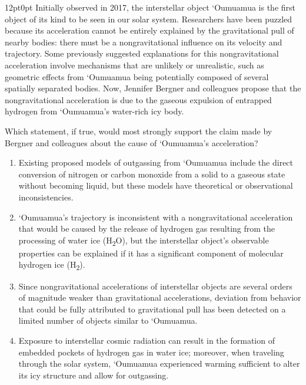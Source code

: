 \documentclass[11pt, twocolumn]{article}
\newcounter{questionnum}
\begin{document}
\vspace{6pt}\noindent
\begin{minipage}{\columnwidth}\raggedright
\noindent{}\par\vspace{8pt}
\begin{adjustwidth}{12pt}{0pt}
Initially observed in 2017, the interstellar object `Oumuamua is the first object of its kind to be seen in our solar system. Researchers have been puzzled because its acceleration cannot be entirely explained by the gravitational pull of nearby bodies: there must be a nongravitational influence on its velocity and trajectory. Some previously suggested explanations for this nongravitational acceleration involve mechanisms that are unlikely or unrealistic, such as geometric effects from `Oumuamua being potentially composed of several spatially separated bodies. Now, Jennifer Bergner and colleagues propose that the nongravitational acceleration is due to the gaseous expulsion of entrapped hydrogen from `Oumuamua's water-rich icy body.
\vspace{6pt}

Which statement, if true, would most strongly support the claim made by Bergner and colleagues about the cause of `Oumuamua's acceleration?
\begin{enumerate}[label=\Alph*),leftmargin=18pt,topsep=3pt,itemsep=2pt]
  \item Existing proposed models of outgassing from `Oumuamua include the direct conversion of nitrogen or carbon monoxide from a solid to a gaseous state without becoming liquid, but these models have theoretical or observational inconsistencies.
  \item `Oumuamua's trajectory is inconsistent with a nongravitational acceleration that would be caused by the release of hydrogen gas resulting from the processing of water ice (H\textsubscript{2}O), but the interstellar object's observable properties can be explained if it has a significant component of molecular hydrogen ice (H\textsubscript{2}).
  \item Since nongravitational accelerations of interstellar objects are several orders of magnitude weaker than gravitational accelerations, deviation from behavior that could be fully attributed to gravitational pull has been detected on a limited number of objects similar to `Oumuamua.
  \item Exposure to interstellar cosmic radiation can result in the formation of embedded pockets of hydrogen gas in water ice; moreover, when traveling through the solar system, `Oumuamua experienced warming sufficient to alter its icy structure and allow for outgassing.
\end{enumerate}
\end{adjustwidth}
\end{minipage}\par
\end{document}
